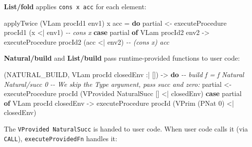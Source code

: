 \documentclass[]{article}
\newenvironment{Shaded}{}{}
\newcommand{\CommentTok}[1]{\textcolor[rgb]{0.38,0.63,0.69}{\textit{#1}}}
\newcommand{\DataTypeTok}[1]{\textcolor[rgb]{0.56,0.13,0.00}{#1}}
\newcommand{\DecValTok}[1]{\textcolor[rgb]{0.25,0.63,0.44}{#1}}
\newcommand{\KeywordTok}[1]{\textcolor[rgb]{0.00,0.44,0.13}{\textbf{#1}}}
\newcommand{\NormalTok}[1]{#1}
\newcommand{\OperatorTok}[1]{\textcolor[rgb]{0.40,0.40,0.40}{#1}}
\newcommand{\OtherTok}[1]{\textcolor[rgb]{0.00,0.44,0.13}{#1}}
\begin{document}
\textbf{List/fold} applies \texttt{cons\ x\ acc} for each element:

\begin{Shaded}
\begin{Highlighting}[]
\NormalTok{applyTwice (}\DataTypeTok{VLam}\NormalTok{ procId1 env1) x acc }\OtherTok{=} \KeywordTok{do}
\NormalTok{    partial }\OtherTok{\textless{}{-}}\NormalTok{ executeProcedure procId1 (x }\OperatorTok{\textless{}|}\NormalTok{ env1)    }\CommentTok{{-}{-} cons x}
    \KeywordTok{case}\NormalTok{ partial }\KeywordTok{of}
        \DataTypeTok{VLam}\NormalTok{ procId2 env2 }\OtherTok{{-}\textgreater{}}\NormalTok{ executeProcedure procId2 (acc }\OperatorTok{\textless{}|}\NormalTok{ env2)  }\CommentTok{{-}{-} (cons x) acc}
\end{Highlighting}
\end{Shaded}

\textbf{Natural/build} and \textbf{List/build} pass runtime-provided functions
to user code:

\begin{Shaded}
\begin{Highlighting}[]
\NormalTok{(}\DataTypeTok{NATURAL\_BUILD}\NormalTok{, }\DataTypeTok{VLam}\NormalTok{ procId closedEnv }\OperatorTok{:|}\NormalTok{ []) }\OtherTok{{-}\textgreater{}} \KeywordTok{do}
    \CommentTok{{-}{-} build f = f Natural Natural/succ 0}
    \CommentTok{{-}{-} We skip the Type argument, pass succ and zero:}
\NormalTok{    partial }\OtherTok{\textless{}{-}}\NormalTok{ executeProcedure procId (}\DataTypeTok{VProvided} \DataTypeTok{NaturalSucc}\NormalTok{ [] }\OperatorTok{\textless{}|}\NormalTok{ closedEnv)}
    \KeywordTok{case}\NormalTok{ partial }\KeywordTok{of}
        \DataTypeTok{VLam}\NormalTok{ procId\textquotesingle{} closedEnv\textquotesingle{} }\OtherTok{{-}\textgreater{}}
\NormalTok{            executeProcedure procId\textquotesingle{} (}\DataTypeTok{VPrim}\NormalTok{ (}\DataTypeTok{PNat} \DecValTok{0}\NormalTok{) }\OperatorTok{\textless{}|}\NormalTok{ closedEnv\textquotesingle{})}
\end{Highlighting}
\end{Shaded}

The \texttt{VProvided\ NaturalSucc} is handed to user code. When user code calls
it (via \texttt{CALL}), \texttt{executeProvidedFn} handles it:
\end{document}

